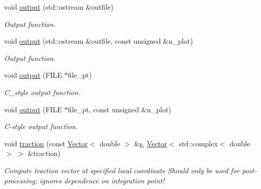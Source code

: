 \begin{DoxyCompactItemize}
void \hyperlink{classoomph_1_1TimeHarmonicFourierDecomposedLinearElasticityTractionElement_a7e87380d0f0d36bb37e2062574f09c05}{output} (std\+::ostream \&outfile)
\begin{DoxyCompactList}\small\item\em Output function. \end{DoxyCompactList}\item 
void \hyperlink{classoomph_1_1TimeHarmonicFourierDecomposedLinearElasticityTractionElement_ad6d5b61ee1b0ddabdd26ee6f6012846d}{output} (std\+::ostream \&outfile, const unsigned \&n\+\_\+plot)
\begin{DoxyCompactList}\small\item\em Output function. \end{DoxyCompactList}\item 
void \hyperlink{classoomph_1_1TimeHarmonicFourierDecomposedLinearElasticityTractionElement_abb2859fcfa2dd1633addc6566db4b784}{output} (F\+I\+LE $\ast$file\+\_\+pt)
\begin{DoxyCompactList}\small\item\em C\+\_\+style output function. \end{DoxyCompactList}\item 
void \hyperlink{classoomph_1_1TimeHarmonicFourierDecomposedLinearElasticityTractionElement_a05047c59ac1f83f44f11f9f6b4e4ec3c}{output} (F\+I\+LE $\ast$file\+\_\+pt, const unsigned \&n\+\_\+plot)
\begin{DoxyCompactList}\small\item\em C-\/style output function. \end{DoxyCompactList}\item 
void \hyperlink{classoomph_1_1TimeHarmonicFourierDecomposedLinearElasticityTractionElement_ae52e642a75d71228bc008d06c4201092}{traction} (const \hyperlink{classoomph_1_1Vector}{Vector}$<$ double $>$ \&\hyperlink{cfortran_8h_ab7123126e4885ef647dd9c6e3807a21c}{s}, \hyperlink{classoomph_1_1Vector}{Vector}$<$ std\+::complex$<$ double $>$ $>$ \&traction)
\begin{DoxyCompactList}\small\item\em Compute traction vector at specified local coordinate Should only be used for post-\/processing; ignores dependence on integration point! \end{DoxyCompactList}\end{DoxyCompactItemize}
